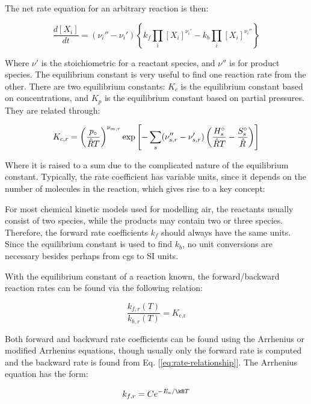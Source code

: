 \documentclass[10pt]{article}
\begin{document}
\begin{flushleft}
The net rate equation for an arbitrary reaction is then:

\begin{equation}
    \frac{d [X_i]}{dt} = (\nu_i'' - \nu_i') \left \{ k_f \prod_i [X_i]^{\nu_i'} - k_b \prod_i [X_i]^{\nu_i''} \right \}
\end{equation}

Where $\nu'$ is the stoichiometric for a reactant species, and $\nu''$ is for product species. The equilibrium constant is very useful to find one reaction rate from the other. There are two equilibrium constants: $K_c$ is the equilibrium constant based on concentrations, and $K_p$ is the equilibrium constant based on partial pressures. They are related through:

\begin{equation}
    K_{c,r} = \left( \frac{p_\circ}{\hat{R}T} \right)^{\nu_{m,r}} \exp{\left[ - \sum_s (\nu_{s,r}'' - \nu_{s,r}') \left( \frac{H_s^\circ}{\hat{R}T} - \frac{S_s^\circ}{\hat{R}} \right) \right]}
\end{equation}

Where it is raised to a sum due to the complicated nature of the equilibrium constant. Typically, the rate coefficient has variable units, since it depends on the number of molecules in the reaction, which gives rise to a key concept:

\begin{remark}
For most chemical kinetic models used for modelling air, the reactants usually consist of two species, while the products may contain two or three species. Therefore, the forward rate coefficients $k_f$ should always have the same units. Since the equilibrium constant is used to find $k_b$, no unit conversions are necessary besides perhaps from cgs to SI units.
\end{remark}

With the equilibrium constant of a reaction known, the forward/backward reaction rates can be found via the following relation:

\begin{equation}
    \frac{k_{f,r}(T)}{k_{b,r}(T)} = K_\text{c,r}
    \label{eq:rate-relationship}
\end{equation}

Both forward and backward rate coefficients can be found using the Arrhenius or modified Arrhenius equations, though usually only the forward rate is computed and the backward rate is found from Eq. [\ref{eq:rate-relationship}]. The Arrhenius equation has the form:

\begin{equation}
    k_{f,r} = C e^{-E_a/\kB T}
\end{equation}


\end{flushleft}
\end{document}
